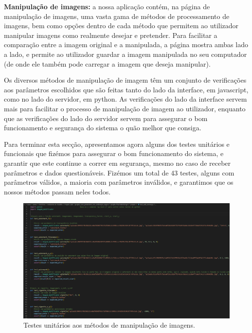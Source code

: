 \documentclass{report}
\begin{document}
    \linebreak
    \bigskip
    \bigskip
    \bigskip
    
    \textbf{Manipulação de imagens:} a nossa aplicação contém, na página de manipulação de imagens, uma vasta gama de métodos de processamento de imagens, bem como opções dentro de cada método que permitem ao utilizador manipular imagens como realmente desejar e pretender. Para facilitar a comparação entre a imagem original e a manipulada, a página mostra ambas lado a lado, e permite ao utilizador guardar a imagem manipulada no seu computador (de onde ele também pode carregar a imagem que deseja manipular).
    
    \linebreak
    \bigskip
    
    Os diversos métodos de manipulação de imagem têm um conjunto de verificações aos parâmetros escolhidos que são feitas tanto do lado da interface, em javascript, como no lado do servidor, em python. As verificações do lado da interface servem mais para facilitar o processo de manipulação de imagem ao utilizador, enquanto que as verificações do lado do servidor servem para assegurar o bom funcionamento e segurança do sistema o quão melhor que consiga.

    \newpage
    Para terminar esta secção, apresentamos agora alguns dos testes unitários e funcionais que fizémos para assegurar o bom funcionamento do sistema, e garantir que este continue a correr em segurança, mesmo no caso de receber parâmetros e dados questionáveis. Fizémos um total de 43 testes, alguns com parâmetros válidos, a maioria com parâmetros inválidos, e garantimos que os nossos métodos passam neles todos.

    \begin{figure}[!hbtp]
        \centering 
        \includegraphics[scale=0.3]{Images_code/15 - testes.png}
        \caption{\label{Testes} Testes unitários aos métodos de manipulação de imagens.}
    \end{figure}
\end{document}
